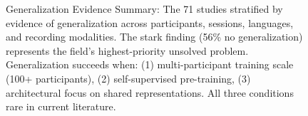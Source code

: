 \begin{figure}[h!]
\caption{Generalization Evidence Summary: The 71 studies stratified by evidence of generalization across participants, sessions, languages, and recording modalities. The stark finding (56\% no generalization) represents the field's highest-priority unsolved problem. Generalization succeeds when: (1) multi-participant training scale (100+ participants), (2) self-supervised pre-training, (3) architectural focus on shared representations. All three conditions rare in current literature.}
\label{fig:generalization_summary}
\end{figure}

